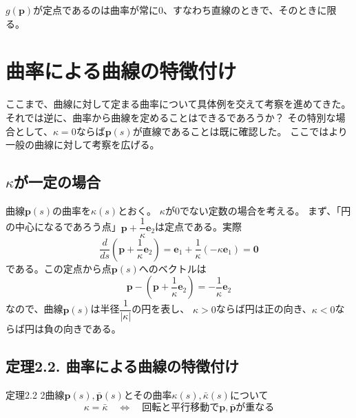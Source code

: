 \documentclass[a4j,disablejfam,dvipdfmx,papersize,slide,uplatex,21pt]{jsarticle}
\begin{document}
$g(\bm{p})$が定点であるのは曲率が常に$0$、すなわち直線のときで、そのときに限る。



\section{曲率による曲線の特徴付け}
ここまで、曲線に対して定まる曲率について具体例を交えて考察を進めてきた。
それでは逆に、曲率から曲線を定めることはできるであろうか？
その特別な場合として、$\kappa = 0$ならば$\bm{p}(s)$が直線であることは既に確認した。
ここではより一般の曲線に対して考察を広げる。

\newpage
\subsection*{$\kappa$が一定の場合}
曲線$\bm{p}(s)$の曲率を$\kappa(s)$とおく。
$\kappa$が$0$でない定数の場合を考える。
まず、「円の中心になるであろう点」$\bm{p} + \dfrac{1}{\kappa} \bm{e}_2$は定点である。実際
\begin{equation}
    \frac{d}{ds} \left( \bm{p} + \dfrac{1}{\kappa} \bm{e}_2 \right)
    = \bm{e}_1 + \frac{1}{\kappa} (- \kappa \bm{e}_1)
    = \bm{0}
\end{equation}
である。この定点から点$\bm{p}(s)$へのベクトルは
\begin{equation}
    \bm{p} - \left( \bm{p} + \dfrac{1}{\kappa} \bm{e}_2 \right)
    = - \frac{1}{\kappa} \bm{e}_2
\end{equation}
なので、曲線$\bm{p}(s)$は半径$\dfrac{1}{|\kappa|}$の円を表し、
$\kappa > 0$ならば円は正の向き、$\kappa < 0$ならば円は負の向きである。

\newpage
\subsection*{定理2.2. 曲率による曲線の特徴付け}
\begin{itembox}[l]{定理2.2}
    2曲線$\bm{p}(s), \bar{\bm{p}}(s)$とその曲率$\kappa(s), \bar{\kappa}(s)$について
    \begin{equation}
        \kappa = \bar{\kappa}
        \quad \Longleftrightarrow \quad
        \text{回転と平行移動で$\bm{p}, \bar{\bm{p}}$が重なる}
    \end{equation}
\end{itembox}
\end{document}
